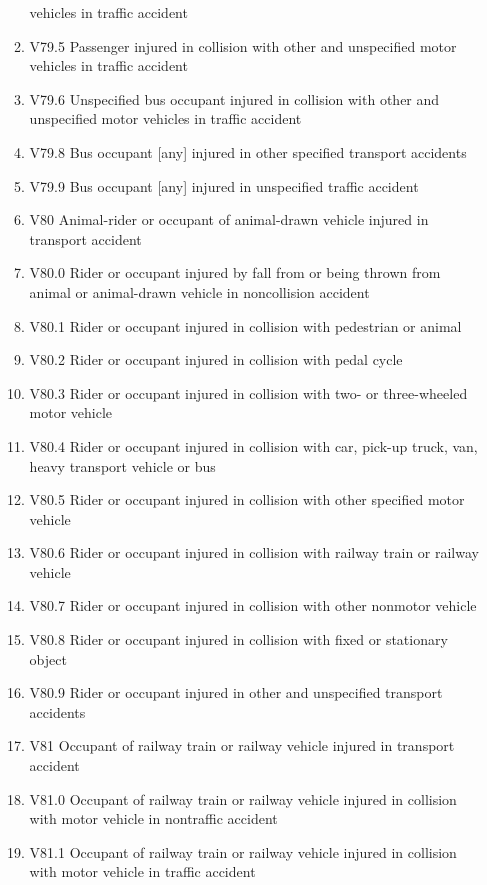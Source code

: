 \documentclass[
]{scrartcl}
\begin{document}
\begin{itemize}
\begin{enumerate}
    vehicles in traffic accident
  \item
    V79.5 Passenger injured in collision with other and unspecified
    motor vehicles in traffic accident
  \item
    V79.6 Unspecified bus occupant injured in collision with other and
    unspecified motor vehicles in traffic accident
  \item
    V79.8 Bus occupant {[}any{]} injured in other specified transport
    accidents
  \item
    V79.9 Bus occupant {[}any{]} injured in unspecified traffic accident
  \item
    V80 Animal-rider or occupant of animal-drawn vehicle injured in
    transport accident
  \item
    V80.0 Rider or occupant injured by fall from or being thrown from
    animal or animal-drawn vehicle in noncollision accident
  \item
    V80.1 Rider or occupant injured in collision with pedestrian or
    animal
  \item
    V80.2 Rider or occupant injured in collision with pedal cycle
  \item
    V80.3 Rider or occupant injured in collision with two- or
    three-wheeled motor vehicle
  \item
    V80.4 Rider or occupant injured in collision with car, pick-up
    truck, van, heavy transport vehicle or bus
  \item
    V80.5 Rider or occupant injured in collision with other specified
    motor vehicle
  \item
    V80.6 Rider or occupant injured in collision with railway train or
    railway vehicle
  \item
    V80.7 Rider or occupant injured in collision with other nonmotor
    vehicle
  \item
    V80.8 Rider or occupant injured in collision with fixed or
    stationary object
  \item
    V80.9 Rider or occupant injured in other and unspecified transport
    accidents
  \item
    V81 Occupant of railway train or railway vehicle injured in
    transport accident
  \item
    V81.0 Occupant of railway train or railway vehicle injured in
    collision with motor vehicle in nontraffic accident
  \item
    V81.1 Occupant of railway train or railway vehicle injured in
    collision with motor vehicle in traffic accident

\end{enumerate}
\end{itemize}
\end{document}
